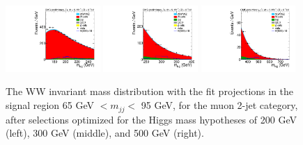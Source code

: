 \documentclass{PoS}
\begin{document}
\begin{figure}[!t]
  \centering
  \includegraphics[width=0.32\textwidth]{H200_Mlvjj_Muon_2jets_Stacked.pdf}
  \includegraphics[width=0.32\textwidth]{H300_Mlvjj_Muon_2jets_Stacked.pdf}
  \includegraphics[width=0.32\textwidth]{H500_Mlvjj_Muon_2jets_Stacked.pdf}
  \caption{\label{fig:mlvjj_mH350} The WW invariant mass distribution
    with the fit projections in the signal region 65 GeV $<m_{jj}<$ 95
    GeV, for the muon 2-jet category, after selections optimized for
    the Higgs mass hypotheses of 200 GeV (left), 300 GeV (middle), and
    500 GeV (right).}
\end{figure}


\end{document}
